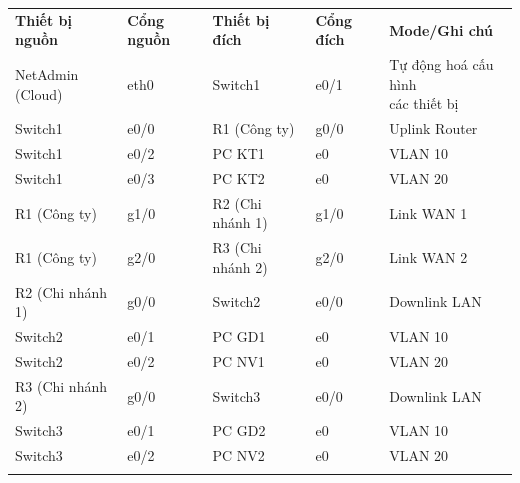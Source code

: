     \begin{tabular}{|>{\centering\arraybackslash}p{2.5cm} || >{\centering\arraybackslash}p{1.5cm} || >{\centering\arraybackslash}p{2.5cm} || >{\centering\arraybackslash}p{1.5cm} || >{\centering\arraybackslash}p{4.5cm} |}
        \hhline{|=|=|=|=|=|}
        \textbf{Thiết bị nguồn} & \textbf{Cổng nguồn} & \textbf{Thiết bị đích} & \textbf{Cổng đích} & \textbf{Mode/Ghi chú} \\
        \hhline{|=|=|=|=|=|}
        
        NetAdmin (Cloud) & eth0 & Switch1 & e0/1 & \makecell{Tự động hoá cấu hình \\ các thiết bị} \\
        \hhline{||-||-||-||-||-||} %
        
        Switch1 & e0/0 & R1 (Công ty) & g0/0 & Uplink Router \\
        \hhline{||-||-||-||-||-||}
        
        Switch1 & e0/2 & PC KT1 & e0 & VLAN 10 \\
        \hhline{||-||-||-||-||-||}
        
        Switch1 & e0/3 & PC KT2 & e0 & VLAN 20 \\
        \hhline{|=|=|=|=|=|} %
        
        R1 (Công ty) & g1/0 & R2 (Chi nhánh 1) & g1/0 & Link WAN 1 \\
        \hhline{||-||-||-||-||-||}
        
        R1 (Công ty) & g2/0 & R3 (Chi nhánh 2) & g2/0 & Link WAN 2 \\
        \hhline{|=|=|=|=|=|}
        
        R2 (Chi nhánh 1) & g0/0 & Switch2 & e0/0 & Downlink LAN \\
        \hhline{||-||-||-||-||-||}
        
        Switch2 & e0/1 & PC GD1 & e0 & VLAN 10 \\
        \hhline{||-||-||-||-||-||}
        
        Switch2 & e0/2 & PC NV1 & e0 & VLAN 20 \\
        \hhline{|=|=|=|=|=|}
        
        R3 (Chi nhánh 2) & g0/0 & Switch3 & e0/0 & Downlink LAN \\
        \hhline{||-||-||-||-||-||}
        
        Switch3 & e0/1 & PC GD2 & e0 & VLAN 10 \\
        \hhline{||-||-||-||-||-||}
        
        Switch3 & e0/2 & PC NV2 & e0 & VLAN 20 \\
        \hhline{|=|=|=|=|=|}
    \end{tabular}
